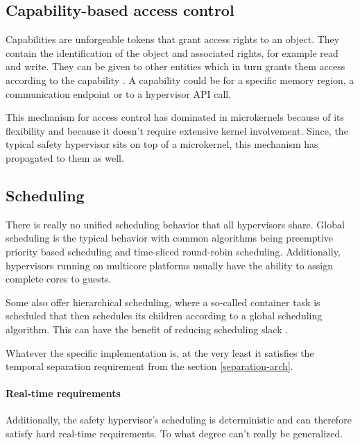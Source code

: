 \subsection{Capability-based access control}
Capabilities are unforgeable tokens that grant access rights to an object. They contain the identification of the object and associated rights, for example read and write.
They can be given to other entities which in turn grants them access according to the capability \cite{Levy.1984}. A capability could be for a specific memory region, a communication endpoint or to a hypervisor \gls{API} call.

This mechanism for access control has dominated in microkernels because of its flexibility and because it doesn't require extensive kernel involvement. Since, the typical safety hypervisor sits on top of a microkernel, this mechanism has propagated to them as well.

\subsection{Scheduling}
There is really no unified scheduling behavior that all hypervisors share. Global scheduling is the typical behavior with common algorithms being preemptive priority based scheduling and time-sliced round-robin scheduling. Additionally, hypervisors running on multicore platforms usually have the ability to assign complete cores to guests.

Some also offer hierarchical scheduling, where a so-called container task is scheduled that then schedules its children according to a global scheduling algorithm. This can have the benefit of reducing scheduling slack \cite{MalcolmS.Mollison.2010}. 

Whatever the specific implementation is, at the very least it satisfies the temporal separation requirement from the section \ref{separation-arch}. 

\paragraph{Real-time requirements}
Additionally, the safety hypervisor's scheduling is deterministic and can therefore satisfy hard real-time requirements. To what degree can't really be generalized.
\begin{comment}
\subsection{Static configuration}
Any mechanism to increase a guests rights at runtime poses the risk of exploitation, be it accidental or purposeful. That is why these systems are typically statically configured and if configuration runtime is at all possible, it is restricted to reducing privilege. For example, a guest that is allowed to spawn other guests may give them his own rights or less than his own but never more.
\end{comment}

